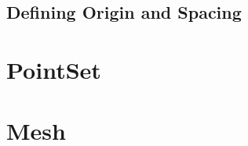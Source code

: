 \subsection{Defining Origin and Spacing}
\label{sec:DefiningImageOriginAndSpacing}
%
%




\section{PointSet}\label{PointSetSection}




\section{Mesh}\label{MeshSection}


